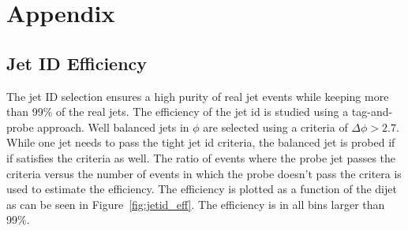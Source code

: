 \chapter{Appendix}
\label{ch:app:physics}

\section{Jet ID Efficiency}

The jet ID selection ensures a high purity of real jet events while keeping more than 99\% of the real jets.
The efficiency of the jet id is studied using a tag-and-probe approach. Well balanced jets in $\phi$ are selected
using a criteria of $\Delta \phi > 2.7$. While one jet needs to pass the tight jet id criteria, the balanced jet is probed
if if satisfies the criteria as well. The ratio of events where the probe jet passes the criteria versus the number of events
in which the probe doesn't pass the critera is used to estimate the efficiency. The efficiency is plotted as a function of the
dijet \ptavg as can be seen in Figure~\ref{fig:jetid_eff}. The efficiency is in all bins larger than 99\%.

